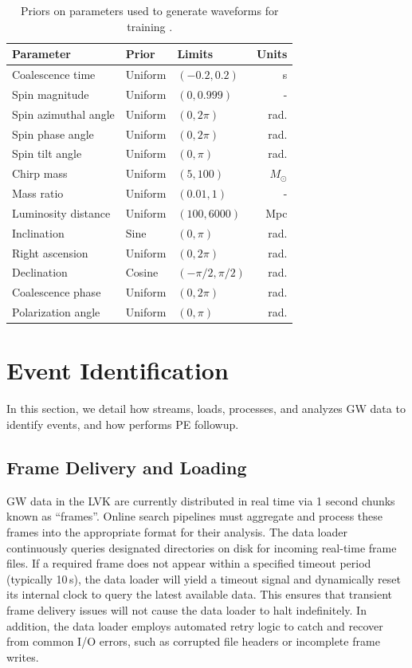 \begin{refsection}
\begin{table}
\centering
\begin{tabular}{ lllr }
\hline
\hline
Parameter & Prior & Limits & Units\\
\hline
Coalescence time & Uniform & $(-0.2, 0.2)$ & s \\
Spin magnitude & Uniform & $(0, 0.999)$ & - \\
Spin azimuthal angle & Uniform & $(0, 2\pi)$ & rad. \\
Spin phase angle & Uniform & $(0, 2\pi)$ & rad. \\
Spin tilt angle & Uniform & $(0, \pi)$ & rad. \\
Chirp mass & Uniform & $(5, 100)$ & $M_{\odot}$ \\
Mass ratio & Uniform & $(0.01, 1)$ & - \\
Luminosity distance & Uniform & $(100, 6000)$ & Mpc \\
Inclination & Sine & $(0, \pi)$ & rad. \\
Right ascension & Uniform & $(0, 2\pi)$ & rad. \\
Declination & Cosine & $(-\pi/2, \pi/2)$ & rad. \\
Coalescence phase & Uniform & $(0, 2\pi)$ & rad. \\
Polarization angle & Uniform & $(0, \pi)$ & rad. \\
\hline
\hline
\end{tabular}
\caption[Training priors for the online \amplfi model]{Priors on parameters used to generate waveforms for training \amplfi.}
\label{online_tab:amplfi-priors}
\end{table}


\section{Event Identification} \label{online_sec:event-identification}
In this section, we detail how \aframe streams, loads, processes, and analyzes GW data to identify events, and how \amplfi performs PE followup.


\subsection{Frame Delivery and Loading}
GW data in the LVK are currently distributed in real time via 1 second chunks known as ``frames''. 
Online search pipelines must aggregate and process these frames into the appropriate format for their analysis. 
The \aframe data loader continuously queries designated directories on disk for incoming real-time frame files. 
If a required frame does not appear within a specified timeout period (typically 10\,s), the data loader will yield a timeout signal and dynamically reset its internal clock to query the latest available data. 
This ensures that transient frame delivery issues will not cause the data loader to halt indefinitely. 
In addition, the data loader employs automated retry logic to catch and recover from common I/O errors, such as corrupted file headers or incomplete frame writes.


\end{refsection}
